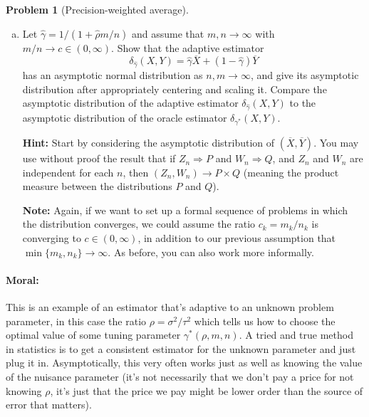 \documentclass{article}
\theoremstyle{definition}
\newtheorem{problem}{Problem}
\begin{document}
\begin{problem}[Precision-weighted average]
\begin{enumerate}[(a)]
{\bf Note:} If you are wondering what it means for both $m$ and $n$ to go to $\infty$, you may assume that we have a sequence of problems indexed by $k=1,2,\ldots$ and $\min \{m_k,n_k\} \to \infty$ as $k\to\infty$. You should feel free to work more informally than this.



\item Let $\hat\gamma = 1/(1+\hat\rho m/n)$ and assume that $m,n\to\infty$ with $m/n \to c \in (0,\infty)$. Show that the adaptive estimator
\[
\delta_{\hat\gamma}(X,Y) = \hat\gamma \overline X + (1-\hat\gamma) \overline Y
\]
has an asymptotic normal distribution as $n,m\to \infty$, and give its asymptotic distribution after appropriately centering and scaling it. Compare the asymptotic distribution of the adaptive estimator $\delta_{\hat\gamma}(X,Y)$ to the asymptotic distribution of the oracle estimator $\delta_{\gamma^*}(X,Y)$.

{\bf Hint:} Start by considering the asymptotic distribution of $(\overline X, \overline Y)$. You may use without proof the result that if $Z_n \Rightarrow P$ and $W_n \Rightarrow Q$, and $Z_n$ and $W_n$ are independent for each $n$, then $(Z_n,W_n) \to P \times Q$ (meaning the product measure between the distributions $P$ and $Q$).

{\bf Note:} Again, if we want to set up a formal sequence of problems in which the distribution converges, we could assume the ratio $c_k = m_k/n_k$ is converging to $c \in (0,\infty)$, in addition to our previous assumption that $\min \{m_k,n_k\}\to\infty$. As before, you can also work more informally.



\end{enumerate}

\paragraph{Moral:} This is an example of an estimator that's adaptive to an unknown problem parameter, in this case the ratio $\rho = \sigma^2/\tau^2$ which tells us how to choose the optimal value of some tuning parameter $\gamma^*(\rho,m,n)$. A tried and true method in statistics is to get a consistent estimator for the unknown parameter and just plug it in. Asymptotically, this very often works just as well as knowing the value of the nuisance parameter (it's not necessarily that we don't pay a price for not knowing $\rho$, it's just that the price we pay might be lower order than the source of error that matters).
\end{problem}
\end{document}
